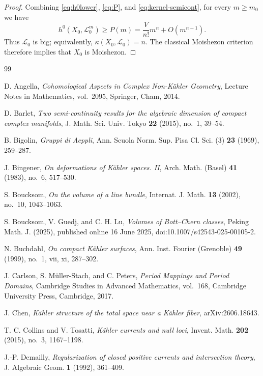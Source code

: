 \documentclass[11pt,letterpaper]{amsart}
\numberwithin{equation}{section}
\newcommand{\cal}{\mathcal}
\def\cL{{\cal L}}
\begin{document}
\begin{proof}
Combining \eqref{eq:h0lower}, \eqref{eq:P}, and
\eqref{eq:kernel-semicont}, for every $m\ge m_0$ we have
\[
 h^0(X_0,\cL_0^m)
 \ge P(m)=\frac{V}{n!}m^n+O(m^{n-1}).
\]
Thus $\cL_0$ is big; equivalently, $\kappa(X_0,\cL_0)=n$. The classical Moishezon criterion therefore implies that $X_0$ is Moishezon.
\end{proof}




\begin{thebibliography}{99}

D. Angella, \textit{Cohomological Aspects in Complex Non-K\"ahler Geometry}, Lecture Notes in Mathematics, vol.~2095, Springer, Cham, 2014.

D. Barlet, \textit{Two semi-continuity results for the algebraic dimension of compact complex manifolds}, J. Math. Sci. Univ. Tokyo \textbf{22} (2015), no.~1, 39--54.

B. Bigolin, \textit{Gruppi di Aeppli}, Ann. Scuola Norm. Sup. Pisa Cl. Sci. (3) \textbf{23} (1969), 259--287.

J. Bingener, \textit{On deformations of K\"ahler spaces. II}, Arch. Math. (Basel) \textbf{41} (1983), no.~6, 517--530.

S. Boucksom, \textit{On the volume of a line bundle}, Internat. J. Math. \textbf{13} (2002), no.~10, 1043--1063.

S. Boucksom, V. Guedj, and C. H. Lu, \textit{Volumes of Bott--Chern classes}, Peking Math. J. (2025), published online 16 June 2025, doi:10.1007/s42543-025-00105-2.

N. Buchdahl, \textit{On compact K\"ahler surfaces}, Ann. Inst. Fourier (Grenoble) \textbf{49} (1999), no.~1, vii, xi, 287--302.

J. Carlson, S. M\"uller-Stach, and C. Peters, \textit{Period Mappings and Period Domains}, Cambridge Studies in Advanced Mathematics, vol.~168, Cambridge University Press, Cambridge, 2017.

J. Chen, \textit{K\"ahler structure of the total space near a K\"ahler fiber}, arXiv:2606.18643.

T. C. Collins and V. Tosatti, \textit{K\"ahler currents and null loci}, Invent. Math. \textbf{202} (2015), no.~3, 1167--1198.

J.-P. Demailly, \textit{Regularization of closed positive currents and intersection theory}, J. Algebraic Geom. \textbf{1} (1992), 361--409.


\end{thebibliography}
\end{document}
